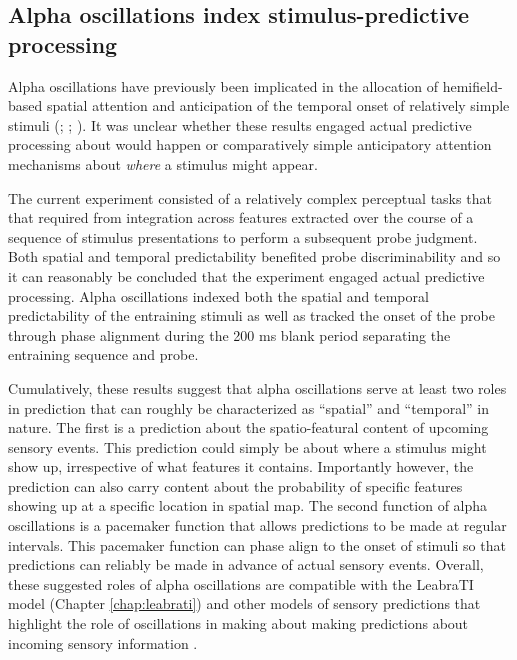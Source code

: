 \documentclass[dwyatte_dissertation.tex]{subfiles}
\begin{document}
\subsection{Alpha oscillations index stimulus-predictive processing}
Alpha oscillations have previously been implicated in the allocation of hemifield-based spatial attention and anticipation of the temporal onset of relatively simple stimuli (; ; ). It was unclear whether these results engaged actual predictive processing about  would happen or comparatively simple anticipatory attention mechanisms about \textit{where} a stimulus might appear. 

The current experiment consisted of a relatively complex perceptual tasks that that required from integration across features extracted over the course of a sequence of stimulus presentations to perform a subsequent probe judgment. Both spatial and temporal predictability benefited probe discriminability and so it can reasonably be concluded that the experiment engaged actual predictive processing. Alpha oscillations indexed both the spatial and temporal predictability of the entraining stimuli as well as tracked the onset of the probe through phase alignment during the 200 ms blank period separating the entraining sequence and probe.

Cumulatively, these results suggest that alpha oscillations serve at least two roles in prediction that can roughly be characterized as ``spatial'' and ``temporal'' in nature. The first is a prediction about the spatio-featural content of upcoming sensory events. This prediction could simply be about where a stimulus might show up, irrespective of what features it contains. Importantly however, the prediction can also carry content about the probability of specific features showing up at a specific location in spatial map\cite{KokRahnevJeheeEtAl12,WyartNobreSummerfield12,HorschigJensenVanSchouwenburgEtAl13}. The second function of alpha oscillations is a pacemaker function that allows predictions to be made at regular intervals. This pacemaker function can phase align to the onset of stimuli \cite{SchroederLakatosKajikawaEtAl08,CalderoneLakatosButlerEtAlInPress} so that predictions can reliably be made in advance of actual sensory events. Overall, these suggested roles of alpha oscillations are compatible with the LeabraTI model (Chapter \ref{chap:leabrati}) and other models of sensory predictions that highlight the role of oscillations in making about making predictions about incoming sensory information \cite{ArnalGiraud12,GiraudPoeppel12}.

%
%
\end{document}
